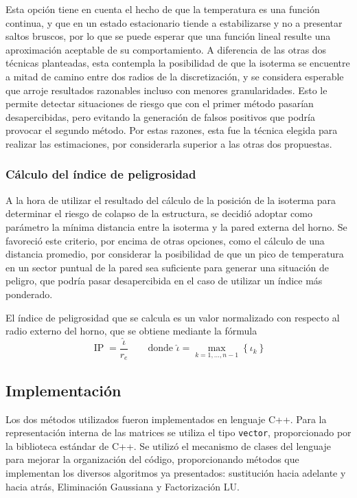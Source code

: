 \begin{enumerate}
                Esta opción tiene en cuenta el hecho de que la temperatura es una función continua, y que en un estado estacionario tiende a estabilizarse y no a presentar saltos bruscos, por lo que se puede esperar que una función lineal resulte una aproximación aceptable de su comportamiento. A diferencia de las otras dos técnicas planteadas, esta contempla la posibilidad de que la isoterma se encuentre a mitad de camino entre dos radios de la discretización, y se considera esperable que arroje resultados razonables incluso con menores granularidades. Esto le permite detectar situaciones de riesgo que con el primer método pasarían desapercibidas, pero evitando la generación de falsos positivos que podría provocar el segundo método. Por estas razones, esta fue la técnica elegida para realizar las estimaciones, por considerarla superior a las otras dos propuestas.
            \end{enumerate}

        \subsubsection{Cálculo del índice de peligrosidad}

            A la hora de utilizar el resultado del cálculo de la posición de la isoterma para determinar el riesgo de colapso de la estructura, se decidió adoptar como parámetro la mínima distancia entre la isoterma y la pared externa del horno. Se favoreció este criterio, por encima de otras opciones, como el cálculo de una distancia promedio, por considerar la posibilidad de que un pico de temperatura en un sector puntual de la pared sea suficiente para generar una situación de peligro, que podría pasar desapercibida en el caso de utilizar un índice más ponderado.

            El índice de peligrosidad que se calcula es un valor normalizado con respecto al radio externo del horno, que se obtiene mediante la fórmula
            \[ \operatorname{IP} = \frac{\hat{\iota}}{r_e} \qquad \text{donde } \hat{\iota} = \max_{k = 1, \dots, n-1} \left\lbrace \iota_k \right\rbrace \]

    \subsection{Implementación}

        Los dos métodos utilizados fueron implementados en lenguaje C++. Para la representación interna de las matrices se utiliza el tipo \texttt{vector}, proporcionado por la biblioteca estándar de C++. Se utilizó el mecanismo de clases del lenguaje para mejorar la organización del código, proporcionando métodos que implementan los diversos algoritmos ya presentados: sustitución hacia adelante y hacia atrás, Eliminación Gaussiana y Factorización LU.

